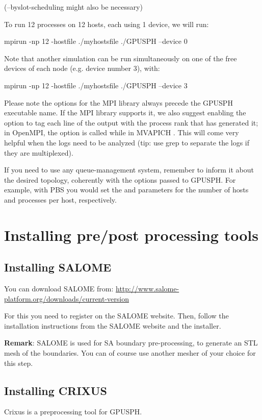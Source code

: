 \documentclass{../GPUSPHtemplate}
\begin{document}
(--byslot-scheduling might also be necessary)

To run 12 processes on 12 hosts, each using 1 device, we will run:

\begin{shellcode}
mpirun -np 12 -hostfile ./myhostsfile ./GPUSPH --device 0
\end{shellcode}

Note that another simulation can be run simultaneously on one of the free devices of each node (e.g. device number 3), with:

\begin{shellcode}
mpirun -np 12 -hostfile ./myhostsfile ./GPUSPH --device 3
\end{shellcode}

Please note the options for the MPI library always precede the GPUSPH executable name.
If the MPI library supports it, we also suggest enabling the option to tag each 
line of the output with the process rank that has generated it; 
in OpenMPI, the option is called  while in MVAPICH . 
This will come very helpful when the logs need to be analyzed (tip: use grep to separate the logs if they are multiplexed).

If you need to use any queue-management system, remember to inform it about the desired topology, 
coherently with the options passed to GPUSPH. For example, with PBS you would set the  
and  parameters for the number of hosts and processes per host, respectively.


\section{Installing pre/post processing tools}

\subsection{Installing SALOME}
You can download SALOME from:
\url{http://www.salome-platform.org/downloads/current-version}

For this you need to register on the SALOME website.
Then, follow the installation instructions from the SALOME website and the
installer.

\textbf{Remark}: SALOME is used for SA boundary pre-processing, to generate an
STL mesh of the boundaries. You can of course use another mesher of your 
choice for this step.

\subsection{Installing CRIXUS}
Crixus is a preprocessing tool for GPUSPH.
\end{document}
